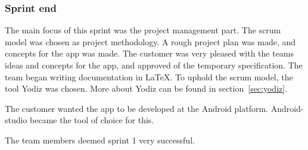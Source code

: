 \subsubsection{Sprint end}
The main focus of this sprint was the project management part. The scrum model was chosen as project methodology. 
A rough project plan was made, and concepts for the app was made.
The customer was very pleased with the teams ideas and concepts for the app, and approved of the temporary specification. 
The team began writing documentation in \LaTeX. To uphold the scrum model, the tool Yodiz was chosen. More about Yodiz can be found in section~\ref{sec:yodiz}.

The customer wanted the app to be developed at the Android platform. Android-studio became the tool of choice for this.

The team members deemed sprint 1 very successful.

